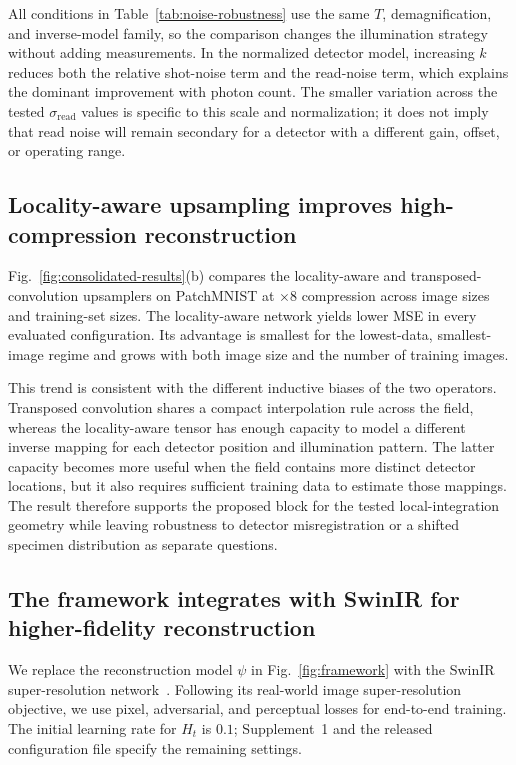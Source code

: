 \documentclass{optica-article}
\begin{document}
All conditions in Table~\ref{tab:noise-robustness} use the same $T$, demagnification, and inverse-model family, so the comparison changes the illumination strategy without adding measurements. In the normalized detector model, increasing $k$ reduces both the relative shot-noise term and the read-noise term, which explains the dominant improvement with photon count. The smaller variation across the tested $\sigma_{\mathrm{read}}$ values is specific to this scale and normalization; it does not imply that read noise will remain secondary for a detector with a different gain, offset, or operating range.

\subsection{Locality-aware upsampling improves high-compression reconstruction}
\label{sec:upsampling-analysis}

Fig.~\ref{fig:consolidated-results}(b) compares the locality-aware and transposed-convolution upsamplers on PatchMNIST at $\times 8$ compression across image sizes and training-set sizes. The locality-aware network yields lower MSE in every evaluated configuration. Its advantage is smallest for the lowest-data, smallest-image regime and grows with both image size and the number of training images.

This trend is consistent with the different inductive biases of the two operators. Transposed convolution shares a compact interpolation rule across the field, whereas the locality-aware tensor has enough capacity to model a different inverse mapping for each detector position and illumination pattern. The latter capacity becomes more useful when the field contains more distinct detector locations, but it also requires sufficient training data to estimate those mappings. The result therefore supports the proposed block for the tested local-integration geometry while leaving robustness to detector misregistration or a shifted specimen distribution as separate questions.

\subsection{The framework integrates with SwinIR for higher-fidelity reconstruction}
\label{sec:swinir-reconstruction}

We replace the reconstruction model $\psi$ in Fig.~\ref{fig:framework} with the SwinIR super-resolution network~\cite{liang2021swinir}. Following its real-world image super-resolution objective, we use pixel, adversarial, and perceptual losses for end-to-end training. The initial learning rate for $H_t$ is $0.1$; Supplement~1 and the released configuration file specify the remaining settings.
\end{document}
